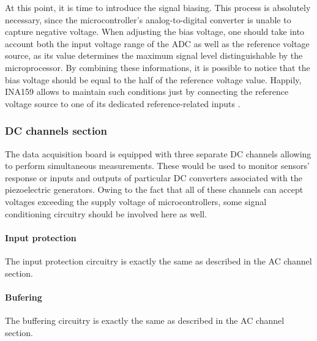 \documentclass[12pt,a4paper]{article}
\begin{document}
At this point, it is time to introduce the signal biasing. This process is absolutely necessary, since the microcontroller's analog-to-digital converter is unable to capture negative voltage. When adjusting the bias voltage, one should take into account both the input voltage range of the ADC as well as the reference voltage source, as its value determines the maximum signal level distinguishable by the microprocessor. By combining these informations, it is possible to notice that the bias voltage should be equal to the half of the reference voltage value. Happily, INA159 allows to maintain such conditions just by connecting the reference voltage source to one of its dedicated reference-related inputs \cite{ina159_params}.

\subsubsection{DC channels section}
The data acquisition board is equipped with three separate DC channels allowing to perform simultaneous measurements. These would be used to monitor sensors' response or inputs and outputs of particular DC converters associated with the piezoelectric generators. Owing to the fact that all of these channels can accept voltages exceeding the supply voltage of microcontrollers, some signal conditioning circuitry should be involved here as well.
\paragraph{Input protection}
The input protection circuitry is exactly the same as described in the AC channel section.
\paragraph{Bufering}
The buffering circuitry is exactly the same as described in the AC channel section.
\end{document}
